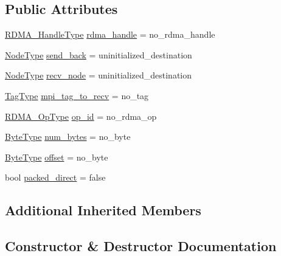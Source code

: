 \subsection*{Public Attributes}
\begin{DoxyCompactItemize}
\item 
\hyperlink{namespacevt_a10442579ec4e7ebef223818e64bcf908}{R\+D\+M\+A\+\_\+\+Handle\+Type} \hyperlink{structvt_1_1rdma_1_1_send_data_message_ad9577ac0894f4d2457d7ac31d85e9042}{rdma\+\_\+handle} = no\+\_\+rdma\+\_\+handle
\item 
\hyperlink{namespacevt_a866da9d0efc19c0a1ce79e9e492f47e2}{Node\+Type} \hyperlink{structvt_1_1rdma_1_1_send_data_message_a9dc041340e97f80049273da30b9214cb}{send\+\_\+back} = uninitialized\+\_\+destination
\item 
\hyperlink{namespacevt_a866da9d0efc19c0a1ce79e9e492f47e2}{Node\+Type} \hyperlink{structvt_1_1rdma_1_1_send_data_message_ad825529ece23e2f7112f825a0e8b24e1}{recv\+\_\+node} = uninitialized\+\_\+destination
\item 
\hyperlink{namespacevt_a84ab281dae04a52a4b243d6bf62d0e52}{Tag\+Type} \hyperlink{structvt_1_1rdma_1_1_send_data_message_a012836b7e2327b722e73bb52f416fe25}{mpi\+\_\+tag\+\_\+to\+\_\+recv} = no\+\_\+tag
\item 
\hyperlink{namespacevt_1_1rdma_a9b966d9780a2b41afe7cd7b7b4b20300}{R\+D\+M\+A\+\_\+\+Op\+Type} \hyperlink{structvt_1_1rdma_1_1_send_data_message_a202afd4750d22c74325b5709db5e025a}{op\+\_\+id} = no\+\_\+rdma\+\_\+op
\item 
\hyperlink{namespacevt_aab8d55968084610ce3b17057981e9300}{Byte\+Type} \hyperlink{structvt_1_1rdma_1_1_send_data_message_ab8941e418cfa243cfa88b67855d3e300}{num\+\_\+bytes} = no\+\_\+byte
\item 
\hyperlink{namespacevt_aab8d55968084610ce3b17057981e9300}{Byte\+Type} \hyperlink{structvt_1_1rdma_1_1_send_data_message_a5dbd859d2b95948103b770322ee85d56}{offset} = no\+\_\+byte
\item 
bool \hyperlink{structvt_1_1rdma_1_1_send_data_message_a8d6ac5c7d5ea89478b7309dd26f04f76}{packed\+\_\+direct} = false
\end{DoxyCompactItemize}
\subsection*{Additional Inherited Members}


\subsection{Constructor \& Destructor Documentation}
\mbox{\label{structvt_1_1rdma_1_1_send_data_message_a0846cf3d3d74c48714b679dc5e42a379}} 
